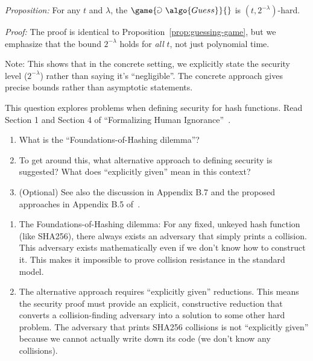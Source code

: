 \ifsolutions
\begin{mysolution}
  \emph{Proposition:} For any $t$ and $\lambda$, the $\game{\Game~\algo{Guess}}{}$ is $(t, 2^{-\lambda})$-hard.
  
  \emph{Proof:} The proof is identical to Proposition~\ref{prop:guessing-game}, but we emphasize that the bound $2^{-\lambda}$ holds for \emph{all} $t$, not just polynomial time.
  
  Note: This shows that in the concrete setting, we explicitly state the security level ($2^{-\lambda}$) rather than saying it's ``negligible''.
  The concrete approach gives precise bounds rather than asymptotic statements.
\end{mysolution}
\fi

\begin{exercise}[Optional]\label{ex:foundations-hashing}
  This question explores problems when defining security for hash functions.
  Read Section 1 and Section 4 of ``Formalizing Human Ignorance''~\cite{VIETCRYPT:Rogaway06}.
  \begin{enumerate}
    \item What is the ``Foundations-of-Hashing dilemma''?
    \item To get around this, what alternative approach to defining security is suggested?
    What does ``explicitly given'' mean in this context?
    \item (Optional) See also the discussion in Appendix B.7 and the proposed approaches in Appendix B.5 of~\cite{AC:BerLan13}.
  \end{enumerate}
\end{exercise}

\ifsolutions
\begin{mysolution}
  \begin{enumerate}
    \item The Foundations-of-Hashing dilemma: For any fixed, unkeyed hash function (like SHA256), there always exists an adversary that simply prints a collision.
    This adversary exists mathematically even if we don't know how to construct it.
    This makes it impossible to prove collision resistance in the standard model.
    \item The alternative approach requires ``explicitly given'' reductions.
    This means the security proof must provide an explicit, constructive reduction that converts a collision-finding adversary into a solution to some other hard problem.
    The adversary that prints SHA256 collisions is not ``explicitly given'' because we cannot actually write down its code (we don't know any collisions).
  \end{enumerate}
\end{mysolution}
\fi
